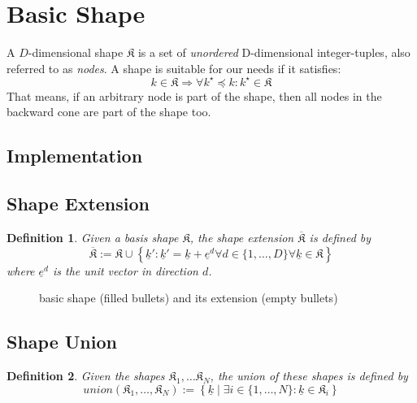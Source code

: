 \documentclass{article}
\newtheorem{definition}{Definition}
\begin{document}
\section{Basic Shape}

A \(D\)-dimensional shape \(\mathfrak{K}\) is a set of \emph{unordered} D-dimensional integer-tuples, also referred to as \emph{nodes}.
A shape is suitable for our needs if it satisfies:
\[k \in \mathfrak{K} \Rightarrow \forall k^\star \preceq k \colon k^\star \in \mathfrak{K}\]
That means, if an arbitrary node is part of the shape, then all nodes in the backward cone are part of the shape too.

\subsection{Implementation}

\subsection{Shape Extension}

\begin{definition}
Given a basis shape \( \mathfrak{K} \), the shape extension
\( \overline{\mathfrak{K}} \) is defined by
\begin{equation}
\overline{\mathfrak{K}} := \mathfrak{K} \cup 
\left\{\underline{k}' \colon \underline{k}' = \underline{k} + \underline{e}^d 
\forall d \in \{1,\ldots,D\} \forall \underline{k} \in \mathfrak{K}\right\}
\end{equation}
where \( \underline{e}^d \) is the unit vector in direction \( d \).
\end{definition}

\begin{figure}[ht]
	\centering
	
	\caption{basic shape (filled bullets) and its extension (empty bullets)}
\end{figure}

\subsection{Shape Union}

\begin{definition}
Given the shapes \( \mathfrak{K}_1, \ldots \mathfrak{K}_N \), the union of these shapes
is defined by
\begin{equation}
union(\mathfrak{K}_1,\ldots,\mathfrak{K}_N) := \left\{ 
\underline{k} \mid \exists i \in \{1, \ldots, N \} \colon \underline{k} \in \mathfrak{K}_i\right\}
\end{equation}
\end{definition}
\end{document}
